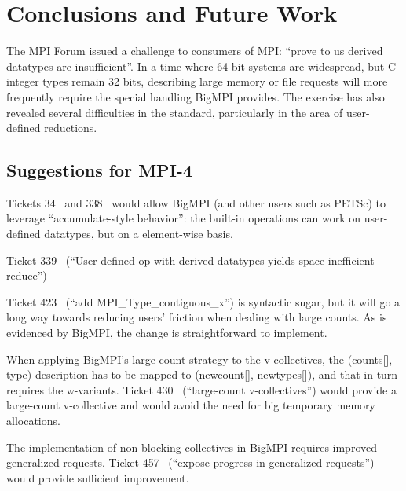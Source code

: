 
\section{Conclusions and Future Work}

The MPI Forum issued a challenge to consumers of MPI: ``prove to us derived
datatypes are insufficient''.  In a time where 64 bit systems are widespread,
but C integer types remain 32 bits, describing large memory or file requests
will more frequently require the special handling BigMPI provides.  The
exercise has also revealed several difficulties in the standard, particularly
in the area of user-defined reductions.

\subsection{Suggestions for MPI-4}

Tickets 34~\cite{ticket34} and 338~\cite{ticket338}
would allow BigMPI (and other users such as PETSc) to leverage ``accumulate-style
behavior'':  the built-in operations can work on user-defined
datatypes, but on a element-wise basis.

Ticket 339~\cite{ticket339} %
(``User-defined op with derived datatypes yields space-inefficient reduce'')

Ticket 423~\cite{ticket423} %
(``add MPI\_Type\_contiguous\_x'') is syntactic sugar, but it will go a long way towards reducing users' friction when dealing with large counts.  As is evidenced by BigMPI, the change is straightforward to implement.

When applying BigMPI's large-count strategy to the v-collectives, the (counts[], type) description has to be mapped to (newcount[], newtypes[]),
and that in turn requires the w-variants.
Ticket 430~\cite{ticket430}
(``large-count v-collectives'') would provide a large-count v-collective and would avoid the need for big temporary memory allocations.

The implementation of non-blocking collectives in BigMPI requires improved generalized requests.
Ticket 457~\cite{ticket457} %
(``expose progress in generalized requests'') would provide sufficient improvement.

